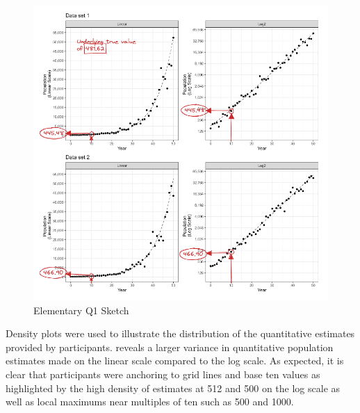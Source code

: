\documentclass[print]{nuthesis}
\begin{document}
\begin{figure}[tbp]

{\centering \includegraphics[width=1\linewidth,]{images/03-estimation/qe1-sketch} 

}

\caption{Elementary Q1 Sketch}\label{fig:qe1-sketch}
\end{figure}

Density plots were used to illustrate the distribution of the quantitative estimates provided by participants.
 reveals a larger variance in quantitative population estimates made on the linear scale compared to the log scale.
As expected, it is clear that participants were anchoring to grid lines and base ten values as highlighted by the high density of estimates at 512 and 500 on the log scale as well as local maximums near multiples of ten such as 500 and 1000.
\end{document}
